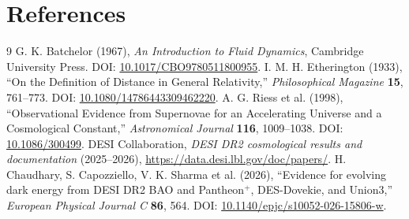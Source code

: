 \documentclass[10pt,a4paper]{article}
\begin{document}
\section*{References}\begin{thebibliography}{9}
 G. K. Batchelor (1967), \emph{An Introduction to Fluid Dynamics}, Cambridge University Press. DOI: \href{https://doi.org/10.1017/CBO9780511800955}{10.1017/CBO9780511800955}.
 I. M. H. Etherington (1933), ``On the Definition of Distance in General Relativity,'' \emph{Philosophical Magazine} \textbf{15}, 761--773. DOI: \href{https://doi.org/10.1080/14786443309462220}{10.1080/14786443309462220}.
 A. G. Riess et al. (1998), ``Observational Evidence from Supernovae for an Accelerating Universe and a Cosmological Constant,'' \emph{Astronomical Journal} \textbf{116}, 1009--1038. DOI: \href{https://doi.org/10.1086/300499}{10.1086/300499}.
 DESI Collaboration, \emph{DESI DR2 cosmological results and documentation} (2025--2026), \url{https://data.desi.lbl.gov/doc/papers/}.
 H. Chaudhary, S. Capozziello, V. K. Sharma et al. (2026), ``Evidence for evolving dark energy from DESI DR2 BAO and Pantheon$^+$, DES-Dovekie, and Union3,'' \emph{European Physical Journal C} \textbf{86}, 564. DOI: \href{https://doi.org/10.1140/epjc/s10052-026-15806-w}{10.1140/epjc/s10052-026-15806-w}.
\end{thebibliography}
\end{document}
